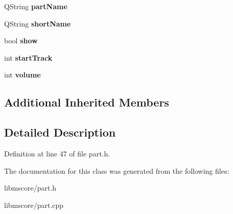 \begin{DoxyCompactItemize}
\mbox{\label{class_ms_1_1_part_a694913c6375b9455b2a1fddde8c939bc}} 
Q\+String {\bfseries part\+Name}
\item 
\mbox{\label{class_ms_1_1_part_a810087ed4c8c7f047d19982aeabb1a44}} 
Q\+String {\bfseries short\+Name}
\item 
\mbox{\label{class_ms_1_1_part_a02eef84ecd3c040f61128d134f6deb6b}} 
bool {\bfseries show}
\item 
\mbox{\label{class_ms_1_1_part_a059ed9fdfe606b1a5c5bbf28d37f6d9f}} 
int {\bfseries start\+Track}
\item 
\mbox{\label{class_ms_1_1_part_aa4e660fa097b4706599d810cba3b1e15}} 
int {\bfseries volume}
\end{DoxyCompactItemize}
\subsection*{Additional Inherited Members}


\subsection{Detailed Description}


Definition at line 47 of file part.\+h.



The documentation for this class was generated from the following files\+:\begin{DoxyCompactItemize}
\item 
libmscore/part.\+h\item 
libmscore/part.\+cpp\end{DoxyCompactItemize}
